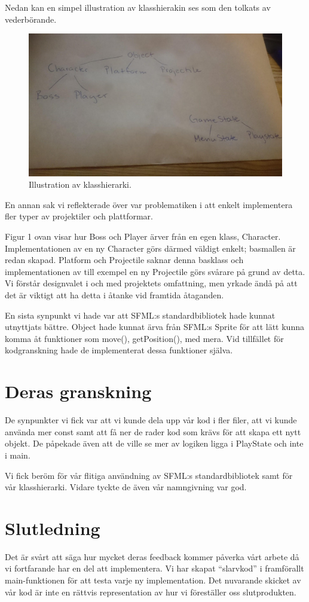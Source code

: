 \documentclass{TDP005mall}
\begin{document}
Nedan kan en simpel illustration av klasshierakin ses som den tolkats av vederbörande.
\begin{figure}[h!]
  \includegraphics[width=0.75\linewidth]{klasser.jpg}
  \caption{Illustration av klasshierarki.}
\end{figure}

En annan sak vi reflekterade över var problematiken i att enkelt implementera fler typer av projektiler och plattformar.

Figur 1 ovan visar hur Boss och Player ärver från en egen klass, Character. Implementationen av en ny Character görs därmed väldigt enkelt; basmallen är redan skapad. Platform och Projectile saknar denna basklass och implementationen av till exempel en ny Projectile görs svårare på grund av detta. Vi förstår designvalet i och med projektets omfattning, men yrkade ändå på att det är viktigt att ha detta i åtanke vid framtida åtaganden.

En sista synpunkt vi hade var att SFML:s standardbibliotek hade kunnat utnyttjats bättre. Object hade kunnat ärva från SFML:s Sprite för att lätt kunna komma åt funktioner som move(), getPosition(), med mera. Vid tillfället för kodgranskning hade de implementerat dessa funktioner själva.

\section{Deras granskning}
De synpunkter vi fick var att vi kunde dela upp vår kod i fler filer, att vi kunde använda mer const samt att få ner de rader kod som krävs för att skapa ett nytt objekt. De påpekade även att de ville se mer av logiken ligga i PlayState och inte i main.

Vi fick beröm för vår flitiga användning av SFML:s standardbibliotek samt för vår klasshierarki. Vidare tyckte de även vår namngivning var god.

\section{Slutledning}
Det är svårt att säga hur mycket deras feedback kommer påverka vårt arbete då vi fortfarande har en del att implementera. Vi har skapat “slarvkod” i framförallt main-funktionen för att testa varje ny implementation. Det nuvarande skicket av vår kod är inte en rättvis representation av hur vi föreställer oss slutprodukten.
\end{document}
